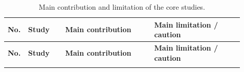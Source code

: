 \documentclass[11pt,a4paper]{article}
\begin{document}
\begin{longtable}{
>{\RaggedRight\arraybackslash}p{0.035\linewidth}
>{\RaggedRight\arraybackslash}p{0.155\linewidth}
>{\RaggedRight\arraybackslash}p{0.360\linewidth}
>{\RaggedRight\arraybackslash}p{0.360\linewidth}
}
\caption{Main contribution and limitation of the core studies.}
\label{tab:core_value}\\

\toprule
\textbf{No.} &
\textbf{Study} &
\textbf{Main contribution} &
\textbf{Main limitation / caution} \\
\midrule
\endfirsthead

\toprule
\textbf{No.} &
\textbf{Study} &
\textbf{Main contribution} &
\textbf{Main limitation / caution} \\
\midrule
\endhead

\bottomrule
\endfoot


\end{longtable}
\end{document}

